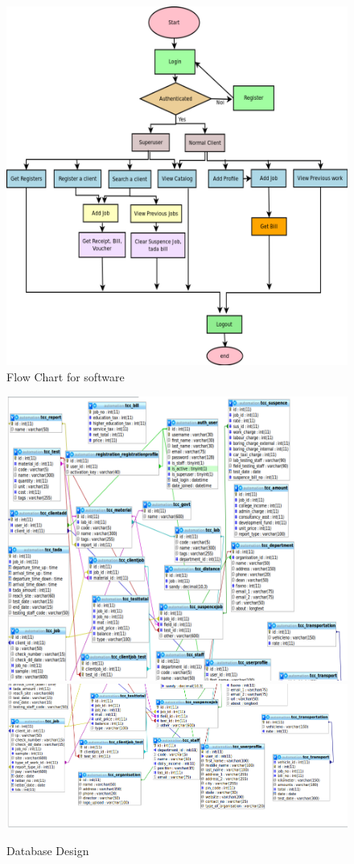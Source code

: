 \newpage
\begin{figure}[h]
\centering \includegraphics[scale=0.5]{images/automation.png}
\caption{Flow Chart for software}
\end{figure}
\newpage

\begin{figure}[h]
\centering \includegraphics[scale=0.5]{images/db1.png}
\centering \includegraphics[scale=0.5]{images/db2.png}
\caption{Database Design}
\end{figure}
\newpage

